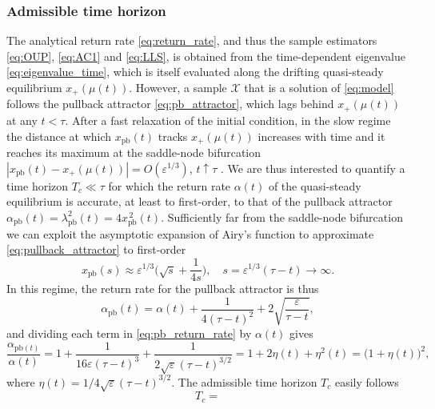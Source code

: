 \documentclass[11pt,a4paper]{article}
\theoremstyle{plain}
\theoremstyle{definition}
\theoremstyle{remark}
\begin{document}
\subsubsection{Admissible time horizon}\label{subsubsec:horizon}
The analytical return rate \eqref{eq:return_rate}, and thus the sample estimators \eqref{eq:OUP}, \eqref{eq:AC1} and \eqref{eq:LLS}, is obtained from the time-dependent eigenvalue \eqref{eq:eigenvalue_time}, which is itself evaluated along the drifting quasi-steady equilibrium $x_+(\mu(t))$.
However, a sample $\mathcal{X}$ that is a solution of \eqref{eq:model} follows the pullback attractor \eqref{eq:pb_attractor}, which lags behind $x_+(\mu(t))$ at any $t<\tau$.
After a fast relaxation of the initial condition, in the slow regime the distance at which $x_{\mathrm{pb}}(t)$ tracks $x_+(\mu(t))$ increases with time and it reaches its maximum at the saddle-node bifurcation $|x_{\mathrm{pb}}(t)-x_+(\mu(t))|=O(\varepsilon^{1/3})$, $t\uparrow\tau$ \cite[Thm.~$2.2.2$]{Berglund2006}.
We are thus interested to quantify a time horizon $T_c\ll\tau$ for which the return rate $\alpha(t)$ of the quasi-steady equilibrium is accurate, at least to first-order, to that of the pullback attractor $\alpha_{\mathrm{pb}}(t)=\lambda_{\mathrm{pb}}^2(t)=4x_{\mathrm{pb}}^{\,2}(t)$.
Sufficiently far from the saddle-node bifurcation we can exploit the asymptotic expansion of Airy's function \cite[\S~$10.4$]{Abramowitz1965} to approximate \eqref{eq:pullback_attractor} to first-order
%
\begin{equation}\label{eq:asymptotic_pullback_attractor}
  x_{\mathrm{pb}}(s)\approx \varepsilon^{1/3}\biggl(\sqrt{s} + \frac{1}{4s}\biggr) , \quad s=\varepsilon^{1/3}(\tau-t)\to\infty.
\end{equation}
%
In this regime, the return rate for the pullback attractor is thus
%
\begin{equation}\label{eq:pb_return_rate}
  \alpha_{\mathrm{pb}}(t) = \alpha(t) + \frac{1}{4(\tau-t)^2} + 2\sqrt{\frac{\varepsilon}{\tau-t}},
\end{equation}
%
and dividing each term in \eqref{eq:pb_return_rate} by $\alpha(t)$ gives
%
\begin{equation}\label{eq:lag_correction}
  \frac{\alpha_{\mathrm{pb}(t)}}{\alpha(t)} = 1 + \frac{1}{16 \varepsilon(\tau - t)^3} + \frac{1}{2\sqrt{\varepsilon}(\tau - t)^{3/2}} = 1 + 2\eta(t) + \eta^2(t) = \bigl(1+\eta(t)\bigr)^2 ,
\end{equation}
%
where $\eta(t)=1/4\sqrt{\varepsilon}(\tau-t)^{3/2}$.
The admissible time horizon $T_c$ easily follows
%
\begin{equation}\label{eq:admissible_time_horizon}
  T_c = 
\end{equation}
\end{document}
